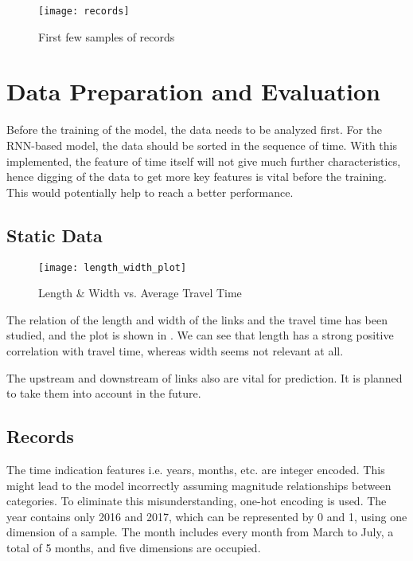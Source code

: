 \begin{figure}[!htb]
    \centering
    \texttt{[image: records]}
    \caption{First few samples of records}
    \label{Figure:records}
\end{figure}

\section{Data Preparation and Evaluation}

Before the training of the model, the data needs to be analyzed first. For the RNN-based model, the data should be sorted in the sequence of time. 
With this implemented, the feature of time itself will not give much further characteristics, hence digging of the data to get more key features is vital before the training. 
This would potentially help to reach a better performance.

\subsection{Static Data}

\begin{figure}[!htb]
    \centering
    \texttt{[image: length\_width\_plot]}
    \caption{Length \& Width vs. Average Travel Time}
    \label{Figure:length_width}
\end{figure}


The relation of the length and width of the links and the travel time has been studied, and the plot is shown in .
We can see that length has a strong positive correlation with travel time, whereas width seems not relevant at all. 

The upstream and downstream of links also are vital for prediction. It is planned to take them into account in the future. 

\subsection{Records}

The time indication features i.e. years, months, etc. are integer encoded. This might lead to the model incorrectly assuming magnitude relationships between categories. 
To eliminate this misunderstanding, one-hot encoding is used. The year contains only 2016 and 2017, which can be represented by 0 and 1, using one dimension of a sample.
The month includes every month from March to July, a total of 5 months, and five dimensions are occupied.

